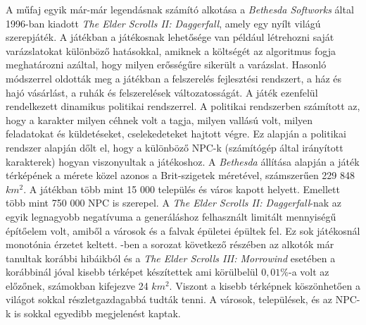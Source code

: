 \noindent A műfaj egyik már-már legendásnak számító alkotása a \textit{Bethesda Softworks} által 1996-ban kiadott \textit{The Elder Scrolls II: Daggerfall}, amely egy nyílt világú szerepjáték. A játékban a játékosnak lehetősége van például létrehozni saját varázslatokat különböző hatásokkal, amiknek a költségét az algoritmus fogja meghatározni azáltal, hogy milyen erősségűre sikerült a varázslat. Hasonló módszerrel oldották meg a játékban a felszerelés fejlesztési rendszert, a ház és hajó vásárlást, a ruhák és felszerelések változatosságát. A játék ezenfelül rendelkezett dinamikus politikai rendszerrel. A politikai rendszerben számított az,  hogy a karakter milyen céhnek volt a tagja, milyen vallású volt, milyen feladatokat és küldetéseket, cselekedeteket hajtott végre. Ez alapján a politikai rendszer alapján dőlt el, hogy a különböző NPC-k (számítógép által irányított karakterek) hogyan viszonyultak a játékoshoz. 
\newline
\newline A \textit{Bethesda} állítása alapján a játék térképének a mérete közel azonos a Brit-szigetek méretével, számszerűen 229 848 $km^2$. A játékban több mint 15 000 település és város kapott helyett. Emellett több mint 750 000 NPC is szerepel. 
\newline
\newline A \textit{The Elder Scrolls II: Daggerfall}-nak az egyik legnagyobb negatívuma a generáláshoz felhasznált limitált mennyiségű építőelem volt, amiből a városok és a falvak épületei épültek fel. Ez sok játékosnál monotónia érzetet keltett. 
\newline
{}-ben a sorozat következő részében az alkotók már tanultak korábbi hibáikból és a \textit{The Elder Scrolls III: Morrowind} esetében a korábbinál jóval kisebb térképet készítettek ami körülbelül $0,01 \%$-a volt az előzőnek, számokban kifejezve 24 $km^2$. Viszont a kisebb térképnek köszönhetően a világot sokkal részletgazdagabbá tudták tenni. A városok, települések, és az NPC-k is sokkal egyedibb megjelenést kaptak.
\newline
